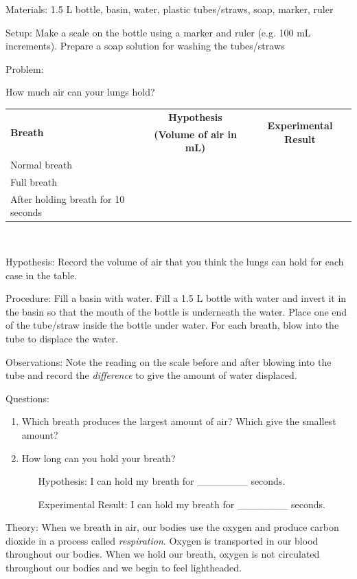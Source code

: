 \begin{description*}
\item[Materials:]{1.5 L bottle, basin, water, plastic tubes/straws, soap, marker, ruler}
\item[Setup:]{Make a scale on the bottle using a marker and ruler (e.g. 100 mL increments). Prepare a soap solution for washing the tubes/straws}\\
\item[Problem:]{How much air can your lungs hold?\\

\begin{tabular}{|l|c|c|} \hline
\multirow{2}{*}{\textbf{Breath}} & \textbf{Hypothesis} & \multirow{2}{*}{\textbf{Experimental Result}} \\
& \textbf{(Volume of air in mL)} & \\ \hline
Normal breath & & \\ \hline
Full breath & & \\ \hline
After holding breath for 10 seconds & & \\ \hline
\end{tabular} \\[10pt]
}
\item[Hypothesis:]{Record the volume of air that you think the lungs can hold for each case in the table.}
\item[Procedure:]{Fill a basin with water. Fill a 1.5 L bottle with water and invert it in the basin so that the mouth of the bottle is underneath the water. Place one end of the tube/straw inside the bottle under water. For each breath, blow into the tube to displace the water.}
\item[Observations:]{Note the reading on the scale before and after blowing into the tube and record the \emph{difference} to give the amount of water displaced.}
\item[Questions:]{}\hfill
\begin{enumerate}
\item Which breath produces the largest amount of air? Which give the smallest amount?
\item How long can you hold your breath?
	\begin{enumerate}
	\item[] Hypothesis: I can hold my breath for \_\_\_\_\_\_\_ seconds.
	\item[] Experimental Result: I can hold my breath for \_\_\_\_\_\_\_ seconds.
	\end{enumerate}
\end{enumerate}
\item[Theory:]{When we breath in air, our bodies use the oxygen and produce carbon dioxide in a process called \emph{respiration}. Oxygen is transported in our blood throughout our bodies. When we hold our breath, oxygen is not circulated throughout our bodies and we begin to feel lightheaded.}
\end{description*}




\pagebreak